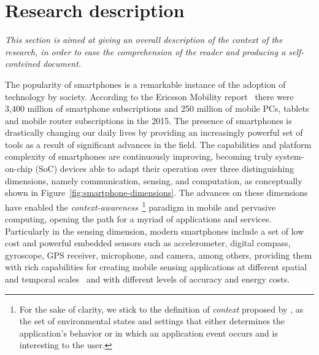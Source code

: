 \documentclass[12pt]{article}
\numberwithin{equation}{section}
\numberwithin{table}{section}
\numberwithin{figure}{section}
\begin{document}
\section{Research description}
\label{sub:research-context}
\emph{This section is aimed at giving an overall description of the context of the research, in order to ease the comprehension of the reader and producing a self-conteined document.}


The popularity of smartphones is a remarkable instance of the adoption of technology by society.
According to the Ericsson Mobility report~\cite{Ericsson2015} there were 3,400 million of smartphone subscriptions and 250 million of mobile PCs, tablets and mobile router subscriptions in the 2015.
The presence of smartphones is drastically changing our daily lives by providing an increasingly powerful set of tools as a result of significant advances in the field.
The capabilities and platform complexity of smartphones are continuously improving, becoming truly system-on-chip (SoC) devices able to adapt their operation over three distinguishing dimensions, namely communication, sensing, and computation, as conceptually shown in Figure~\ref{fig:smartphone-dimensions}.
The advances on these dimensions have enabled the \emph{context-awareness}~\footnote{For the sake of clarity, we stick to the definition of \emph{context} proposed by \cite{Chen2000}, as the set of environmental states and settings that either determines the application’s behavior or in which an application event occurs and is interesting to the user.} paradigm in mobile and pervasive computing, opening the path for a myriad of applications and services.
Particularly in the sensing dimension, modern smartphones include a set of low cost and powerful embedded sensors such as accelerometer, digital compass, gyroscope, GPS receiver, microphone, and camera, among others, providing them with rich capabilities for creating mobile sensing applications at different spatial and temporal scales~\cite{Lane2010,Campbell2012,Kjaergaard2012} and with different levels of accuracy and energy costs.
\end{document}
